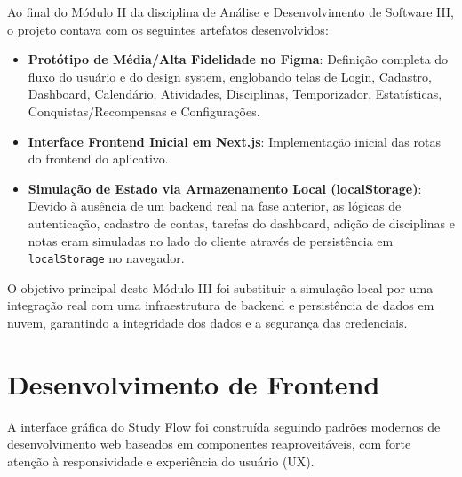 \documentclass[12pt,a4paper]{article}
\begin{document}
Ao final do Módulo II da disciplina de Análise e Desenvolvimento de Software III, o projeto contava com os seguintes artefatos desenvolvidos:
\begin{itemize}
    \item \textbf{Protótipo de Média/Alta Fidelidade no Figma}: Definição completa do fluxo do usuário e do design system, englobando telas de Login, Cadastro, Dashboard, Calendário, Atividades, Disciplinas, Temporizador, Estatísticas, Conquistas/Recompensas e Configurações.
    \item \textbf{Interface Frontend Inicial em Next.js}: Implementação inicial das rotas do frontend do aplicativo.
    \item \textbf{Simulação de Estado via Armazenamento Local (localStorage)}: Devido à ausência de um backend real na fase anterior, as lógicas de autenticação, cadastro de contas, tarefas do dashboard, adição de disciplinas e notas eram simuladas no lado do cliente através de persistência em \texttt{localStorage} no navegador.
\end{itemize}

O objetivo principal deste Módulo III foi substituir a simulação local por uma integração real com uma infraestrutura de backend e persistência de dados em nuvem, garantindo a integridade dos dados e a segurança das credenciais.

\section{Desenvolvimento de Frontend}
A interface gráfica do Study Flow foi construída seguindo padrões modernos de desenvolvimento web baseados em componentes reaproveitáveis, com forte atenção à responsividade e experiência do usuário (UX).
\end{document}
